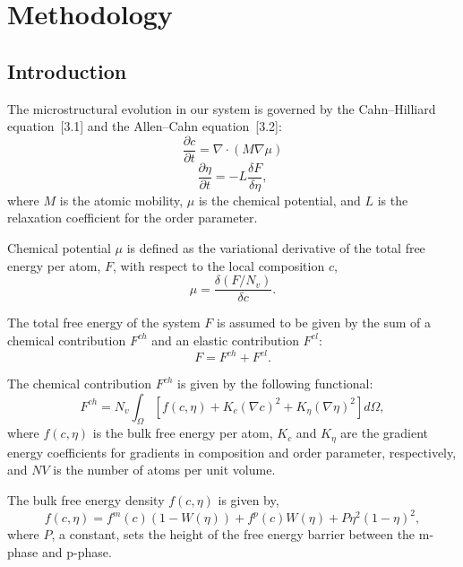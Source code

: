 \chapter{Methodology}

\section{Introduction}

The microstructural evolution in our system is governed by the Cahn--Hilliard equation~[3.1] and the Allen--Cahn equation~[3.2]:
\begin{equation}
\frac{\partial c}{\partial t}=\nabla\cdot(M\nabla\mu)
\end{equation}
\begin{equation}
\frac{\partial \eta}{\partial t}=-L\frac{\delta F}{\delta \eta},
\end{equation}
where $M$ is the atomic mobility, $\mu$ is the chemical potential, and $L$ is the relaxation coefficient for the order parameter.

Chemical potential $\mu$ is defined as the variational derivative of the total free energy per atom, $F$, with respect to the local composition $c$,
\begin{equation}
\mu=\frac{\delta \left(F/N_v\right)}{\delta c}.
\end{equation}

The total free energy of the system $F$ is assumed to be given by the sum of a chemical contribution $F^{ch}$ and an elastic contribution $F^{el}$:
\begin{equation}
F=F^{ch}+F^{el}.
\end{equation}

The chemical contribution $F^{ch}$ is given by the following functional:
\begin{equation}
F^{ch}=N_v\int_\Omega \left[f(c,\eta)+K_c(\nabla c)^2+K_\eta(\nabla \eta)^2\right] d\Omega,
\end{equation}
where $f(c,\eta)$ is the bulk free energy per atom, $K_c$ and $K_\eta$ are the gradient energy coefficients for gradients in composition and order parameter, respectively, and $NV$ is the number of atoms per unit volume.

The bulk free energy density $f(c,\eta)$ is given by,
\begin{equation}
f(c,\eta)=f^{m}(c)\left(1-W(\eta)\right)+f^p(c)W(\eta)+P\eta^2(1-\eta)^2,
\end{equation}
where $P$, a constant, sets the height of the free energy barrier between the m-phase and p-phase.

